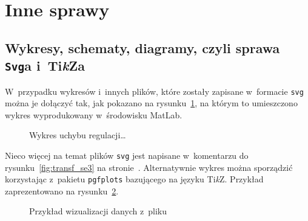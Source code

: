 {\red

\section{Inne sprawy}

\subsection{Wykresy, schematy, diagramy, czyli sprawa \texttt{Svg}a i~Ti{\it k}Za}

W~przypadku wykresów i~innych plików, które zostały zapisane w~formacie \texttt{svg} można je dołączyć tak, jak pokazano na rysunku~\ref{fig:svg_input}, na którym to umieszczono wykres wyprodukowany w~środowisku MatLab. 
\begin{figure}[tp]
      \centering
    
    \renewcommand{\figurename}{\red Rysunek}%
    \caption[Wykres uchybu regulacji\ldots]{\red Wykres uchybu regulacji\ldots}
    \label{fig:svg_input}
\end{figure}
Nieco więcej na temat plików \texttt{svg} jest napisane w~komentarzu do rysunku~\ref{fig:transf_se3} na stronie~\pageref{fig:transf_se3}. Alternatywnie wykres można sporządzić korzystając z~pakietu \texttt{pgfplots} \cite{pgfplots} bazującego na języku Ti{\it k}Z. Przykład zaprezentowano na rysunku~\ref{tikz_wykres}.}
\begin{figure}[tp]
  \centering
  \renewcommand{\figurename}{\red Rysunek}%
  \caption[Przykład wizualizacji danych z~pliku]{\red Przykład wizualizacji danych z~pliku}
  \label{tikz_wykres}
\end{figure}


